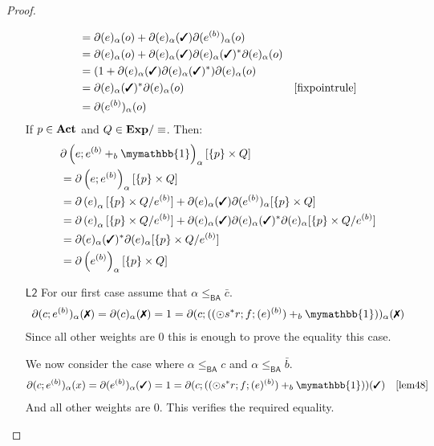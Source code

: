 \documentclass[a4paper,UKenglish,cleveref, autoref, thm-restate]{lipics-v2021}
\newcommand{\cmark}{\text{\ding{51}}}
\newcommand{\xmark}{\text{\ding{55}}}
\newcommand{\Act}{\textbf{\upshape{Act}}}
\newcommand{\Exp}{\textbf{\upshape{Exp}}}
\newcommand{\BA}{\textsf{BA}}
\newcommand{\Ax}[1]{\ensuremath{\mathsf{#1}}}
\newcommand{\bskip}{\mymathbb{1}}
\theoremstyle{plain}\newtheoremrep{thm}{Theorem}[section]
\begin{document}
\begin{toappendix}
\begin{proof}
\begin{enumerate}
\begin{align*}
					&= \partial(e)_\alpha(o)+\partial(e)_\alpha(\cmark)\partial(e^{(b)})_\alpha(o)\\
					&= \partial(e)_\alpha(o)+\partial(e)_\alpha(\cmark)\partial(e)_\alpha(\cmark)^*\partial(e)_\alpha(o)\\
					&= (1+\partial(e)_\alpha(\cmark)\partial(e)_\alpha(\cmark)^*)\partial(e)_\alpha(o)\\
					&= \partial(e)_\alpha(\cmark)^*\partial(e)_\alpha(o) &\cref{fixpointrule}\\
					&= \partial(e^{(b)})_\alpha(o)
				\end{align*}
				If $p \in \Act$ and $Q \in \Exp/\equiv$. Then: 
				\begin{align*}
					&\partial\left(e;e^{(b)}+_b \bskip\right)_\alpha[\{p\}\times Q] \\
					&= \partial\left(e;e^{(b)}\right)_\alpha[\{p\}\times Q]\\
					&= \partial\left(e\right)_\alpha[\{p\}\times Q/e^{(b)}] + \partial(e)_\alpha(\cmark)\partial(e^{(b)})_\alpha[\{p\}\times Q]\\
					&= \partial\left(e\right)_\alpha[\{p\}\times Q/e^{(b)}] + \partial(e)_\alpha(\cmark)\partial(e)_\alpha(\cmark)^*\partial(e)_\alpha[\{p\}\times Q/e^{(b)}]\\
					&= \partial(e)_\alpha(\cmark)^*\partial(e)_\alpha[\{p\}\times Q/e^{(b)}]\\
					&= \partial\left(e^{(b)}\right)_\alpha[\{p\}\times Q]
				\end{align*}
				\item[\Ax{L2}] 
				For our first case assume that $\alpha \leq_{\BA} \bar c$.
				\begin{align*}
					\partial(c;e^{(b)})_\alpha(\xmark) = \partial(c)_\alpha(\xmark) = 1 = \partial(c;((\odot s^*r ;f;(e)^{(b)})+_b \bskip))_\alpha(\xmark)
				\end{align*}
				Since all other weights are $0$ this is enough to prove the equality this case.
				
				We now consider the case where $\alpha \leq_{\BA} c$ and $\alpha \leq_{\BA} \bar b$.
				\begin{align*}
					\partial(c;e^{(b)})_\alpha(x) = \partial(e^{(b)})_\alpha(\cmark) = 1& = \partial(c;((\odot s^*r ;f;(e)^{(b)})+_b \bskip))(\cmark) & \cref{lem48}
				\end{align*}
				And all other weights are $0$. This verifies the required equality.
	

\end{enumerate}
\end{proof}
\end{toappendix}
\end{document}
